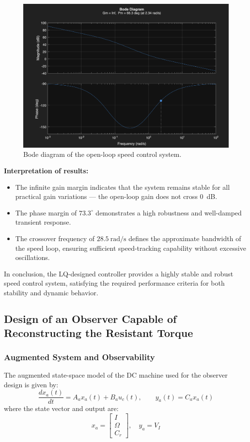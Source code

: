 \documentclass{rapportCS}
\begin{document}
\begin{figure}[H]
    \centering
    \includegraphics[width=0.85\linewidth]{figures/bode.png}
    \caption{Bode diagram of the open-loop speed control system.}
    \label{fig:bode_speed_loop}
\end{figure}

\noindent\textbf{Interpretation of results:}
\begin{itemize}
    \item The infinite gain margin indicates that the system remains stable for all practical gain variations — the open-loop gain does not cross 0~dB.
    \item The phase margin of $73.3^{\circ}$ demonstrates a high robustness and well-damped transient response.
    \item The crossover frequency of $28.5~\mathrm{rad/s}$ defines the approximate bandwidth of the speed loop, ensuring sufficient speed-tracking capability without excessive oscillations.
\end{itemize}

In conclusion, the LQ-designed controller provides a highly stable and robust speed control system, satisfying the required performance criteria for both stability and dynamic behavior.

\subsection{Design of an Observer Capable of Reconstructing the Resistant Torque}
\subsubsection{Augmented System and Observability}

The augmented state-space model of the DC machine used for the observer design is given by:
\begin{equation*}
\frac{d x_a(t)}{dt} = A_a x_a(t) + B_a u_c(t), \qquad y_a(t) = C_a x_a(t)
\end{equation*}
where the state vector and output are:
\[
x_a = 
\begin{bmatrix}
I \\[4pt] \Omega \\[4pt] C_r
\end{bmatrix}, 
\quad
y_a = V_I
\]
\end{document}
